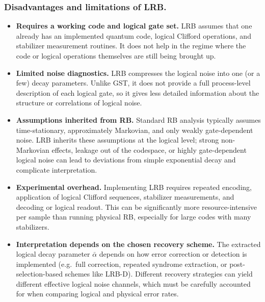 \subsubsection{Disadvantages and limitations of LRB.}
\begin{itemize}
  \item \textbf{Requires a working code and logical gate set.}
  LRB assumes that one already has an implemented quantum code, logical
  Clifford operations, and stabilizer measurement routines. It does not
  help in the regime where the code or logical operations themselves are
  still being brought up.

  \item \textbf{Limited noise diagnostics.}
  LRB compresses the logical noise into one (or a few) decay parameters.
  Unlike GST, it does not provide a full process-level description of
  each logical gate, so it gives less detailed information about the
  structure or correlations of logical noise.

  \item \textbf{Assumptions inherited from RB.}
  Standard RB analysis typically assumes time-stationary, approximately
  Markovian, and only weakly gate-dependent noise. LRB inherits these
  assumptions at the logical level; strong non-Markovian effects,
  leakage out of the codespace, or highly gate-dependent logical noise
  can lead to deviations from simple exponential decay and complicate
  interpretation.

  \item \textbf{Experimental overhead.}
  Implementing LRB requires repeated encoding, application of logical
  Clifford sequences, stabilizer measurements, and decoding or logical
  readout. This can be significantly more resource-intensive per sample
  than running physical RB, especially for large codes with many
  stabilizers.

  \item \textbf{Interpretation depends on the chosen recovery scheme.}
  The extracted logical decay parameter $\bar{\alpha}$ depends on how
  error correction or detection is implemented (e.g.\ full correction,
  repeated syndrome extraction, or post-selection-based schemes like
  LRB-D). Different recovery strategies can yield different effective
  logical noise channels, which must be carefully accounted for when
  comparing logical and physical error rates.
\end{itemize}




